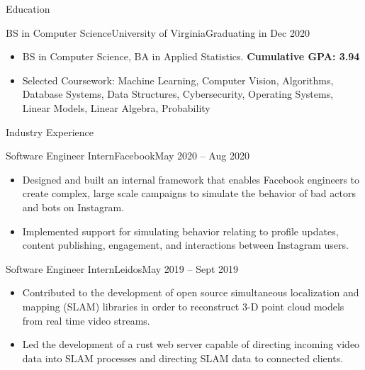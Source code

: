 \documentclass[]{mcdowellcv}
\begin{document}
\makeheader


\begin{cvsection}{Education}
    \begin{cvsubsection}{BS in Computer Science}{University of Virginia}{Graduating in Dec 2020}
        \begin{itemize}
            \item BS in Computer Science, BA in Applied Statistics. \textbf{Cumulative GPA: 3.94}
            \item Selected Coursework: Machine Learning, Computer Vision, Algorithms, Database Systems, Data Structures, Cybersecurity, Operating Systems, Linear Models, Linear Algebra, Probability 
        \end{itemize}
    \end{cvsubsection}
\end{cvsection}
\begin{cvsection}{Industry Experience}
    \begin{cvsubsection}{Software Engineer Intern}{Facebook}{May 2020 -- Aug 2020}
        \begin{itemize}%
            \item Designed and built an internal framework that enables Facebook engineers to create complex, large scale campaigns to simulate the behavior of bad actors and bots on Instagram.
            \item Implemented support for simulating behavior relating to profile updates, content publishing, engagement, and interactions between Instagram users.
        \end{itemize}
    \end{cvsubsection}

    \begin{cvsubsection}{Software Engineer Intern}{Leidos}{May 2019 -- Sept 2019}
        \begin{itemize}%
            \item Contributed to the development of open source simultaneous localization and mapping (SLAM) libraries in order to reconstruct 3-D point cloud models from real time video streams.
            \item Led the development of a rust web server capable of directing incoming video data into SLAM processes and directing SLAM data to connected clients.
        \end{itemize}
    \end{cvsubsection}
\end{cvsection}
\end{document}
